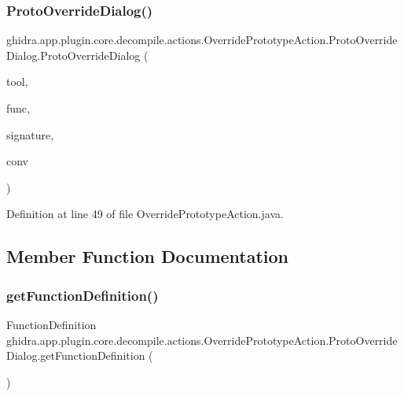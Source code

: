 \subsubsection{\texorpdfstring{ProtoOverrideDialog()}{ProtoOverrideDialog()}}
{\footnotesize\ttfamily ghidra.\+app.\+plugin.\+core.\+decompile.\+actions.\+Override\+Prototype\+Action.\+Proto\+Override\+Dialog.\+Proto\+Override\+Dialog (\begin{DoxyParamCaption}\item[{Plugin\+Tool}]{tool,  }\item[{Function}]{func,  }\item[{String}]{signature,  }\item[{String}]{conv }\end{DoxyParamCaption})\hspace{0.3cm}{\ttfamily [inline]}}



Definition at line 49 of file Override\+Prototype\+Action.\+java.



\subsection{Member Function Documentation}
\mbox{\label{classghidra_1_1app_1_1plugin_1_1core_1_1decompile_1_1actions_1_1_override_prototype_action_1_1_proto_override_dialog_a00d5c5714668d6a38bbc1059a2f3fd4d}} 
\subsubsection{\texorpdfstring{getFunctionDefinition()}{getFunctionDefinition()}}
{\footnotesize\ttfamily Function\+Definition ghidra.\+app.\+plugin.\+core.\+decompile.\+actions.\+Override\+Prototype\+Action.\+Proto\+Override\+Dialog.\+get\+Function\+Definition (\begin{DoxyParamCaption}{ }\end{DoxyParamCaption})\hspace{0.3cm}{\ttfamily [inline]}}



